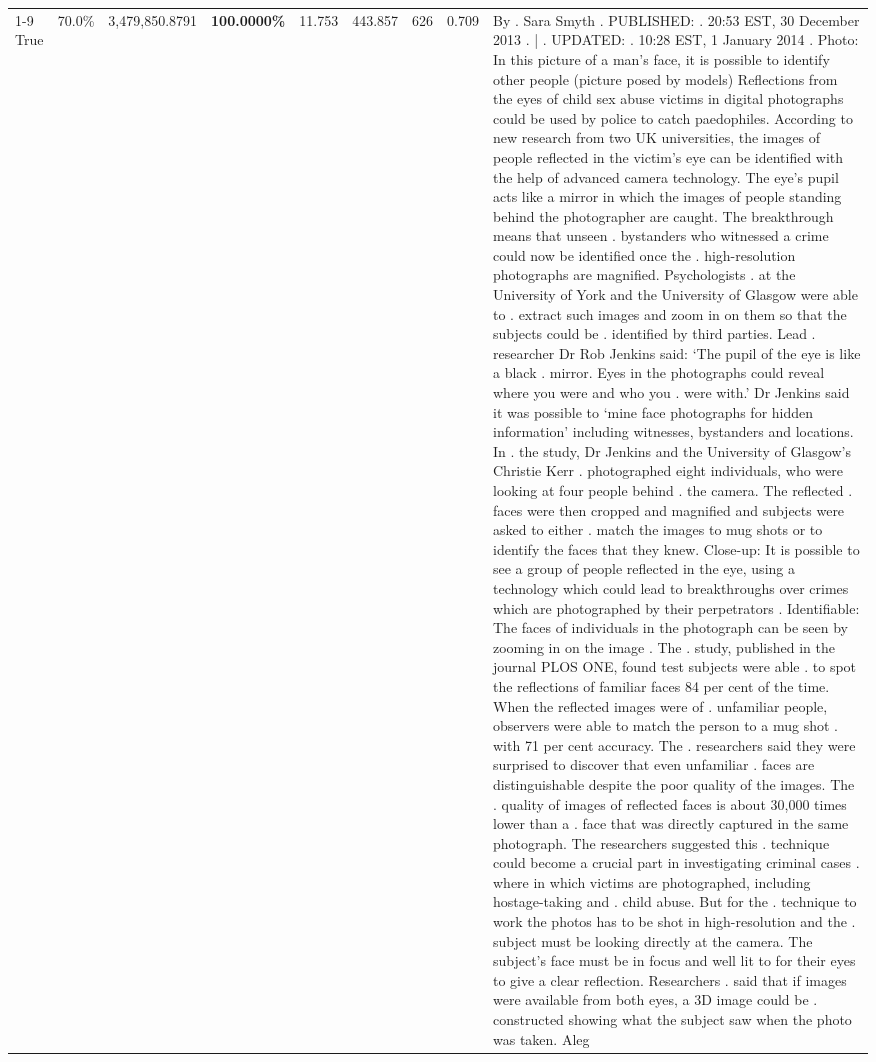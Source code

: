 \begin{table}[H]
\begin{tabular}{lllrlllll}
\cline{1-9}
True & 70.0\% & 3,479,850.8791 & \bfseries \color{red} 100.0000\% & 11.753 & 443.857 & 626 & 0.709 & By . Sara Smyth . PUBLISHED: . 20:53 EST, 30 December 2013 . | . UPDATED: . 10:28 EST, 1 January 2014 . Photo: In this picture of a man's face, it is possible to identify other people (picture posed by models) Reflections from the eyes of child sex abuse victims in digital photographs could be used by police to catch paedophiles. According to new research from two UK universities, the images of people reflected in the victim's eye can be identified with the help of advanced camera technology. The eye's pupil acts like a mirror in which the images of people standing behind the photographer are caught. The breakthrough means that unseen . bystanders who witnessed a crime could now be identified once the . high-resolution photographs are magnified. Psychologists . at the University of York and the University of Glasgow were able to . extract such images and zoom in on them so that the subjects could be . identified by third parties. Lead . researcher Dr Rob Jenkins said: ‘The pupil of the eye is like a black . mirror. Eyes in the photographs could reveal where you were and who you . were with.' Dr Jenkins said it was possible to ‘mine face photographs for hidden information' including witnesses, bystanders and locations. In . the study, Dr Jenkins and the University of Glasgow's Christie Kerr . photographed eight individuals, who were looking at four people behind . the camera. The reflected . faces were then cropped and magnified and subjects were asked to either . match the images to mug shots or to identify the faces that they knew. Close-up: It is possible to see a group of people reflected in the eye, using a technology which could lead to breakthroughs over crimes which are photographed by their perpetrators . Identifiable: The faces of individuals in the photograph can be seen by zooming in on the image . The . study, published in the journal PLOS ONE, found test subjects were able . to spot the reflections of familiar faces 84 per cent of the time. When the reflected images were of . unfamiliar people, observers were able to match the person to a mug shot . with 71 per cent accuracy. The . researchers said they were surprised to discover that even unfamiliar . faces are distinguishable despite the poor quality of the images. The . quality of images of reflected faces is about 30,000 times lower than a . face that was directly captured in the same photograph. The researchers suggested this . technique could become a crucial part in investigating criminal cases . where in which victims are photographed, including hostage-taking and . child abuse. But for the . technique to work the photos has to be shot in high-resolution and the . subject must be looking directly at the camera. The subject's face must be in focus and well lit to for their eyes to give a clear reflection. Researchers . said that if images were available from both eyes, a 3D image could be . constructed showing what the subject saw when the photo was taken. Aleg \\

\end{tabular}
\end{table}
